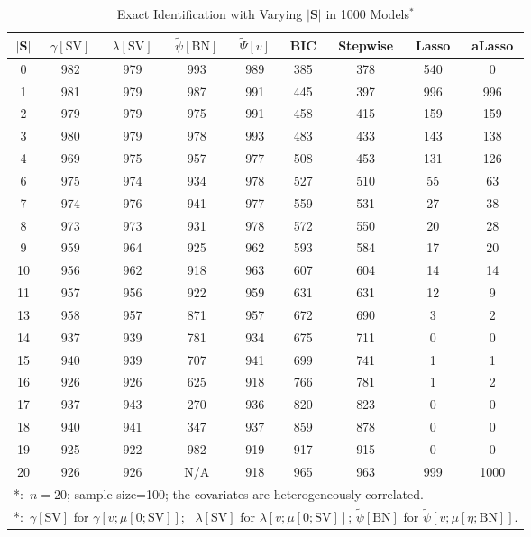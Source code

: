 \documentclass[a4paper,12pt]{article}
\begin{document}
\begin{table}
\caption{Exact Identification with Varying $|\mathbf{S}|$ in 1000 Models$^*$}
\label{tb:size_of_S}
\centering
\begin{tabular}{c || c |c |c |c |c |c |c |c}
\hline \hline
$|\mathbf{S}|$& $\gamma[\mathrm{SV}]$& $\lambda[\mathrm{SV}]$& $\tilde\psi[\mathrm{BN}]$ & $\tilde\Psi[v]$& BIC & Stepwise& Lasso& aLasso \\ \hline
0&  982&  979&  993&  989&  385& 378& 540&0 \\
1&  981&  979&  987&  991&  445& 397& 996&996 \\
2&  979&  979&  975&  991&  458& 415& 159&159 \\
3&  980&  979&  978&  993&  483& 433& 143&138 \\
4&  969&  975&  957&  977&  508& 453& 131&126 \\
6&  975&  974&  934&  978&  527& 510&  55&63 \\
7&  974&  976&  941&  977&  559& 531&  27&38 \\
8&  973&  973&  931&  978&  572& 550&  20&28 \\
9&  959&  964&  925&  962&  593& 584&  17&20 \\
10& 956&  962&  918&  963&  607& 604&  14&14 \\
11& 957&  956&  922&  959&  631& 631&  12&9 \\
13& 958&  957&  871&  957&  672& 690&   3&2 \\
14& 937&  939&  781&  934&  675& 711&   0&0 \\
15& 940&  939&  707&  941&  699& 741&   1&1 \\
16& 926&  926&  625&  918&  766& 781&   1&2 \\
17& 937&  943&  270&  936&  820& 823&   0&0 \\
18& 940&  941&  347&  937&  859& 878&   0&0 \\
19& 925& 922&   982&  919&  917& 915&   0&0 \\
20& 926& 926&   N/A&  918&  965& 963& 999&1000 \\ \hline \hline
\multicolumn{9}{l}{\small{*:\ $n=20$; sample size=100; the covariates are heterogeneously correlated.}}  \\
\multicolumn{9}{l}{\small{*:\ $\gamma[\mathrm{SV}]$ for $\gamma[v;\mu[0;\mathrm{SV}]]$; \ $\lambda[\mathrm{SV}]$ for $\lambda[v;\mu[0;\mathrm{SV}]]$; $\tilde\psi[\mathrm{BN}]$ for $\tilde\psi[v;\mu[\eta;\mathrm{BN}]]$.}}  \\
\end{tabular}
\end{table}
\end{document}
